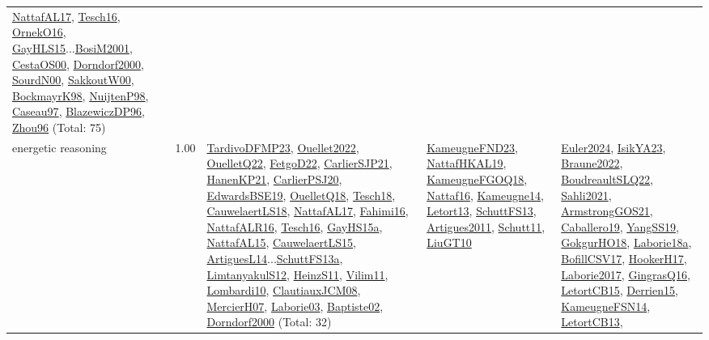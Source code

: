 {\begin{longtable}{p{3cm}r>{\raggedright\arraybackslash}p{6cm}>{\raggedright\arraybackslash}p{6cm}>{\raggedright\arraybackslash}p{8cm}}
\hyperref[detail:NattafAL17]{NattafAL17}, \hyperref[detail:Tesch16]{Tesch16}, \hyperref[detail:OrnekO16]{OrnekO16}, \hyperref[detail:GayHLS15]{GayHLS15}...\hyperref[detail:BosiM2001]{BosiM2001}, \hyperref[detail:CestaOS00]{CestaOS00}, \hyperref[detail:Dorndorf2000]{Dorndorf2000}, \hyperref[detail:SourdN00]{SourdN00}, \hyperref[detail:SakkoutW00]{SakkoutW00}, \hyperref[detail:BockmayrK98]{BockmayrK98}, \hyperref[detail:NuijtenP98]{NuijtenP98}, \hyperref[detail:Caseau97]{Caseau97}, \hyperref[detail:BlazewiczDP96]{BlazewiczDP96}, \hyperref[detail:Zhou96]{Zhou96} (Total: 75)\\
\index{energetic reasoning}\index{Algorithms!energetic reasoning}energetic reasoning &  1.00 & \hyperref[detail:TardivoDFMP23]{TardivoDFMP23}, \hyperref[detail:Ouellet2022]{Ouellet2022}, \hyperref[detail:OuelletQ22]{OuelletQ22}, \hyperref[detail:FetgoD22]{FetgoD22}, \hyperref[detail:CarlierSJP21]{CarlierSJP21}, \hyperref[detail:HanenKP21]{HanenKP21}, \hyperref[detail:CarlierPSJ20]{CarlierPSJ20}, \hyperref[detail:EdwardsBSE19]{EdwardsBSE19}, \hyperref[detail:OuelletQ18]{OuelletQ18}, \hyperref[detail:Tesch18]{Tesch18}, \hyperref[detail:CauwelaertLS18]{CauwelaertLS18}, \hyperref[detail:NattafAL17]{NattafAL17}, \hyperref[detail:Fahimi16]{Fahimi16}, \hyperref[detail:NattafALR16]{NattafALR16}, \hyperref[detail:Tesch16]{Tesch16}, \hyperref[detail:GayHS15a]{GayHS15a}, \hyperref[detail:NattafAL15]{NattafAL15}, \hyperref[detail:CauwelaertLS15]{CauwelaertLS15}, \hyperref[detail:ArtiguesL14]{ArtiguesL14}...\hyperref[detail:SchuttFS13a]{SchuttFS13a}, \hyperref[detail:LimtanyakulS12]{LimtanyakulS12}, \hyperref[detail:HeinzS11]{HeinzS11}, \hyperref[detail:Vilim11]{Vilim11}, \hyperref[detail:Lombardi10]{Lombardi10}, \hyperref[detail:ClautiauxJCM08]{ClautiauxJCM08}, \hyperref[detail:MercierH07]{MercierH07}, \hyperref[detail:Laborie03]{Laborie03}, \hyperref[detail:Baptiste02]{Baptiste02}, \hyperref[detail:Dorndorf2000]{Dorndorf2000} (Total: 32) & \hyperref[detail:KameugneFND23]{KameugneFND23}, \hyperref[detail:NattafHKAL19]{NattafHKAL19}, \hyperref[detail:KameugneFGOQ18]{KameugneFGOQ18}, \hyperref[detail:Nattaf16]{Nattaf16}, \hyperref[detail:Kameugne14]{Kameugne14}, \hyperref[detail:Letort13]{Letort13}, \hyperref[detail:SchuttFS13]{SchuttFS13}, \hyperref[detail:Artigues2011]{Artigues2011}, \hyperref[detail:Schutt11]{Schutt11}, \hyperref[detail:LiuGT10]{LiuGT10} & \hyperref[detail:Euler2024]{Euler2024}, \hyperref[detail:IsikYA23]{IsikYA23}, \hyperref[detail:Braune2022]{Braune2022}, \hyperref[detail:BoudreaultSLQ22]{BoudreaultSLQ22}, \hyperref[detail:Sahli2021]{Sahli2021}, \hyperref[detail:ArmstrongGOS21]{ArmstrongGOS21}, \hyperref[detail:Caballero19]{Caballero19}, \hyperref[detail:YangSS19]{YangSS19}, \hyperref[detail:GokgurHO18]{GokgurHO18}, \hyperref[detail:Laborie18a]{Laborie18a}, \hyperref[detail:BofillCSV17]{BofillCSV17}, \hyperref[detail:HookerH17]{HookerH17}, \hyperref[detail:Laborie2017]{Laborie2017}, \hyperref[detail:GingrasQ16]{GingrasQ16}, \hyperref[detail:LetortCB15]{LetortCB15}, \hyperref[detail:Derrien15]{Derrien15}, \hyperref[detail:KameugneFSN14]{KameugneFSN14}, \hyperref[detail:LetortCB13]{LetortCB13}, 
\end{longtable}}
